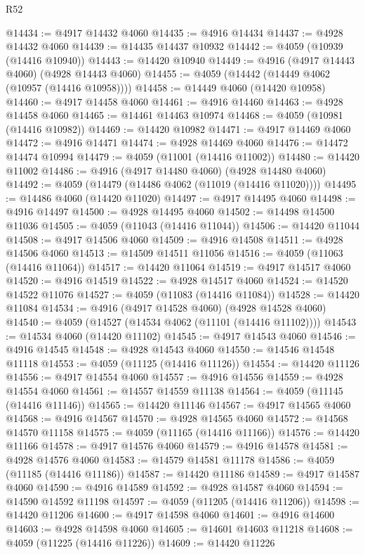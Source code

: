 \begin{lexlean}{R52}
\begin{coremodule}
@14434 := @4917 @14432 @4060
@14435 := @4916 @14434
@14437 := @4928 @14432 @4060
@14439 := @14435 @14437 @10932
@14442 := @4059 (@10939 (@14416 @10940))
@14443 := @14420 @10940
@14449 := @4916 (@4917 @14443 @4060) (@4928 @14443 @4060)
@14455 := @4059 (@14442 (@14449 @4062 (@10957 (@14416 @10958))))
@14458 := @14449 @4060 (@14420 @10958)
@14460 := @4917 @14458 @4060
@14461 := @4916 @14460
@14463 := @4928 @14458 @4060
@14465 := @14461 @14463 @10974
@14468 := @4059 (@10981 (@14416 @10982))
@14469 := @14420 @10982
@14471 := @4917 @14469 @4060
@14472 := @4916 @14471
@14474 := @4928 @14469 @4060
@14476 := @14472 @14474 @10994
@14479 := @4059 (@11001 (@14416 @11002))
@14480 := @14420 @11002
@14486 := @4916 (@4917 @14480 @4060) (@4928 @14480 @4060)
@14492 := @4059 (@14479 (@14486 @4062 (@11019 (@14416 @11020))))
@14495 := @14486 @4060 (@14420 @11020)
@14497 := @4917 @14495 @4060
@14498 := @4916 @14497
@14500 := @4928 @14495 @4060
@14502 := @14498 @14500 @11036
@14505 := @4059 (@11043 (@14416 @11044))
@14506 := @14420 @11044
@14508 := @4917 @14506 @4060
@14509 := @4916 @14508
@14511 := @4928 @14506 @4060
@14513 := @14509 @14511 @11056
@14516 := @4059 (@11063 (@14416 @11064))
@14517 := @14420 @11064
@14519 := @4917 @14517 @4060
@14520 := @4916 @14519
@14522 := @4928 @14517 @4060
@14524 := @14520 @14522 @11076
@14527 := @4059 (@11083 (@14416 @11084))
@14528 := @14420 @11084
@14534 := @4916 (@4917 @14528 @4060) (@4928 @14528 @4060)
@14540 := @4059 (@14527 (@14534 @4062 (@11101 (@14416 @11102))))
@14543 := @14534 @4060 (@14420 @11102)
@14545 := @4917 @14543 @4060
@14546 := @4916 @14545
@14548 := @4928 @14543 @4060
@14550 := @14546 @14548 @11118
@14553 := @4059 (@11125 (@14416 @11126))
@14554 := @14420 @11126
@14556 := @4917 @14554 @4060
@14557 := @4916 @14556
@14559 := @4928 @14554 @4060
@14561 := @14557 @14559 @11138
@14564 := @4059 (@11145 (@14416 @11146))
@14565 := @14420 @11146
@14567 := @4917 @14565 @4060
@14568 := @4916 @14567
@14570 := @4928 @14565 @4060
@14572 := @14568 @14570 @11158
@14575 := @4059 (@11165 (@14416 @11166))
@14576 := @14420 @11166
@14578 := @4917 @14576 @4060
@14579 := @4916 @14578
@14581 := @4928 @14576 @4060
@14583 := @14579 @14581 @11178
@14586 := @4059 (@11185 (@14416 @11186))
@14587 := @14420 @11186
@14589 := @4917 @14587 @4060
@14590 := @4916 @14589
@14592 := @4928 @14587 @4060
@14594 := @14590 @14592 @11198
@14597 := @4059 (@11205 (@14416 @11206))
@14598 := @14420 @11206
@14600 := @4917 @14598 @4060
@14601 := @4916 @14600
@14603 := @4928 @14598 @4060
@14605 := @14601 @14603 @11218
@14608 := @4059 (@11225 (@14416 @11226))
@14609 := @14420 @11226

\end{coremodule}
\end{lexlean}
